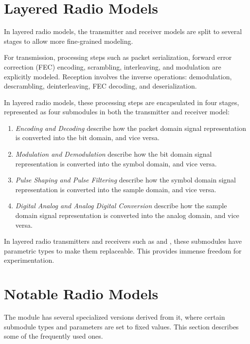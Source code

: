 \section{Layered Radio Models}
\label{sec:phy:layered-radio-models}

In layered radio models, the transmitter and receiver models are split
to several stages to allow more fine-grained modeling.

For transmission, processing steps such as packet serialization,
forward error correction (FEC) encoding, scrambling, interleaving, and
modulation are explicitly modeled. Reception involves the inverse
operations: demodulation, descrambling, deinterleaving,
FEC decoding, and deserialization.

In layered radio models, these processing steps are encapsulated
in four stages, represented as four submodules in both the
transmitter and receiver model:

\begin{enumerate}
  \item \textit{Encoding and Decoding} describe how the packet domain
    signal representation is converted into the bit domain, and vice versa.
  \item \textit{Modulation and Demodulation} describe how the bit domain
    signal representation is converted into the symbol domain, and vice versa.
  \item \textit{Pulse Shaping and Pulse Filtering} describe how the
    symbol domain signal representation is converted into the sample domain,
    and vice versa.
  \item \textit{Digital Analog and Analog Digital Conversion} describe
    how the sample domain signal representation is converted into the
    analog domain, and vice versa.
\end{enumerate}

In layered radio transmitters and receivers such as 
and , these submodules have parametric
types to make them replaceable. This provides immense freedom for
experimentation.

\section{Notable Radio Models}
\label{sec:phy:notable-radio-models}

The  module has several specialized versions derived
from it, where certain submodule types and parameters are set to fixed values.
This section describes some of the frequently used ones.

